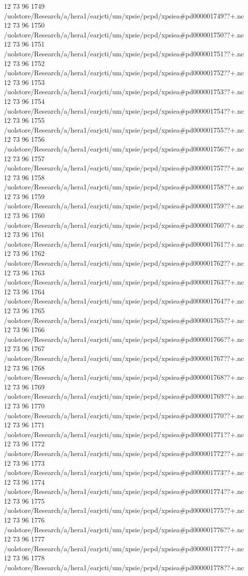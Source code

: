 12 73 96
1749
/uolstore/Research/a/hera1/earjcti/um/xpsie/pcpd/xpsiea#pd000001749??+.nc
12 73 96
1750
/uolstore/Research/a/hera1/earjcti/um/xpsie/pcpd/xpsiea#pd000001750??+.nc
12 73 96
1751
/uolstore/Research/a/hera1/earjcti/um/xpsie/pcpd/xpsiea#pd000001751??+.nc
12 73 96
1752
/uolstore/Research/a/hera1/earjcti/um/xpsie/pcpd/xpsiea#pd000001752??+.nc
12 73 96
1753
/uolstore/Research/a/hera1/earjcti/um/xpsie/pcpd/xpsiea#pd000001753??+.nc
12 73 96
1754
/uolstore/Research/a/hera1/earjcti/um/xpsie/pcpd/xpsiea#pd000001754??+.nc
12 73 96
1755
/uolstore/Research/a/hera1/earjcti/um/xpsie/pcpd/xpsiea#pd000001755??+.nc
12 73 96
1756
/uolstore/Research/a/hera1/earjcti/um/xpsie/pcpd/xpsiea#pd000001756??+.nc
12 73 96
1757
/uolstore/Research/a/hera1/earjcti/um/xpsie/pcpd/xpsiea#pd000001757??+.nc
12 73 96
1758
/uolstore/Research/a/hera1/earjcti/um/xpsie/pcpd/xpsiea#pd000001758??+.nc
12 73 96
1759
/uolstore/Research/a/hera1/earjcti/um/xpsie/pcpd/xpsiea#pd000001759??+.nc
12 73 96
1760
/uolstore/Research/a/hera1/earjcti/um/xpsie/pcpd/xpsiea#pd000001760??+.nc
12 73 96
1761
/uolstore/Research/a/hera1/earjcti/um/xpsie/pcpd/xpsiea#pd000001761??+.nc
12 73 96
1762
/uolstore/Research/a/hera1/earjcti/um/xpsie/pcpd/xpsiea#pd000001762??+.nc
12 73 96
1763
/uolstore/Research/a/hera1/earjcti/um/xpsie/pcpd/xpsiea#pd000001763??+.nc
12 73 96
1764
/uolstore/Research/a/hera1/earjcti/um/xpsie/pcpd/xpsiea#pd000001764??+.nc
12 73 96
1765
/uolstore/Research/a/hera1/earjcti/um/xpsie/pcpd/xpsiea#pd000001765??+.nc
12 73 96
1766
/uolstore/Research/a/hera1/earjcti/um/xpsie/pcpd/xpsiea#pd000001766??+.nc
12 73 96
1767
/uolstore/Research/a/hera1/earjcti/um/xpsie/pcpd/xpsiea#pd000001767??+.nc
12 73 96
1768
/uolstore/Research/a/hera1/earjcti/um/xpsie/pcpd/xpsiea#pd000001768??+.nc
12 73 96
1769
/uolstore/Research/a/hera1/earjcti/um/xpsie/pcpd/xpsiea#pd000001769??+.nc
12 73 96
1770
/uolstore/Research/a/hera1/earjcti/um/xpsie/pcpd/xpsiea#pd000001770??+.nc
12 73 96
1771
/uolstore/Research/a/hera1/earjcti/um/xpsie/pcpd/xpsiea#pd000001771??+.nc
12 73 96
1772
/uolstore/Research/a/hera1/earjcti/um/xpsie/pcpd/xpsiea#pd000001772??+.nc
12 73 96
1773
/uolstore/Research/a/hera1/earjcti/um/xpsie/pcpd/xpsiea#pd000001773??+.nc
12 73 96
1774
/uolstore/Research/a/hera1/earjcti/um/xpsie/pcpd/xpsiea#pd000001774??+.nc
12 73 96
1775
/uolstore/Research/a/hera1/earjcti/um/xpsie/pcpd/xpsiea#pd000001775??+.nc
12 73 96
1776
/uolstore/Research/a/hera1/earjcti/um/xpsie/pcpd/xpsiea#pd000001776??+.nc
12 73 96
1777
/uolstore/Research/a/hera1/earjcti/um/xpsie/pcpd/xpsiea#pd000001777??+.nc
12 73 96
1778
/uolstore/Research/a/hera1/earjcti/um/xpsie/pcpd/xpsiea#pd000001778??+.nc
